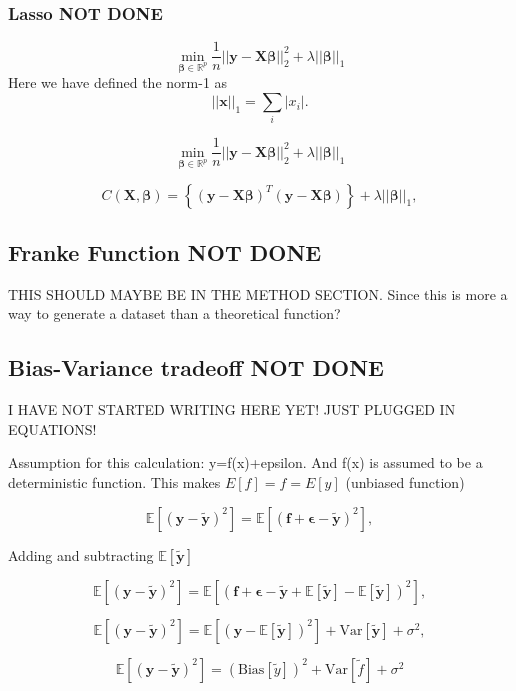 \subsubsection{Lasso NOT DONE}
$$
{\displaystyle \min_{\boldsymbol{\beta}\in
{\mathbb{R}}^{p}}}\frac{1}{n}\vert\vert \boldsymbol{y}-\boldsymbol{X}\boldsymbol{\beta}\vert\vert_2^2+\lambda\vert\vert \boldsymbol{\beta}\vert\vert_1
$$
Here we have defined the norm-1 as
$$
\vert\vert \boldsymbol{x}\vert\vert_1 = \sum_i \vert x_i\vert.
$$

$$
{\displaystyle \min_{\boldsymbol{\beta}\in
{\mathbb{R}}^{p}}}\frac{1}{n}\vert\vert \boldsymbol{y}-\boldsymbol{X}\boldsymbol{\beta}\vert\vert_2^2+\lambda\vert\vert \boldsymbol{\beta}\vert\vert_1
$$

$$
C(\boldsymbol{X},\boldsymbol{\beta})=\left\{(\boldsymbol{y}-\boldsymbol{X}\boldsymbol{\beta})^T(\boldsymbol{y}-\boldsymbol{X}\boldsymbol{\beta})\right\}+\lambda\vert\vert\boldsymbol{\beta}\vert\vert_1,
$$




\subsection{Franke Function NOT DONE}
THIS SHOULD MAYBE BE IN THE METHOD SECTION. Since this is more a way to generate a dataset than a theoretical function?


\subsection{Bias-Variance tradeoff NOT DONE}
I HAVE NOT STARTED WRITING HERE YET! JUST PLUGGED IN EQUATIONS!

Assumption for this calculation: y=f(x)+epsilon. And f(x) is assumed to be a deterministic function. This makes $E[f]=f=E[y]$ (unbiased function)

$$
\mathbb{E}\left[(\mathbf{y}-\mathbf{\tilde{y}})^2\right]=\mathbb{E}\left[(\mathbf{f}+\mathbf{\epsilon}-\mathbf{\tilde{y}})^2\right],
$$

Adding and subtracting $\mathbb{E}\left[\mathbf{\tilde{y}}\right]$

$$
\mathbb{E}\left[(\mathbf{y}-\mathbf{\tilde{y}})^2\right]=\mathbb{E}\left[(\mathbf{f}+\mathbf{\epsilon}-\mathbf{\tilde{y}}+\mathbb{E}\left[\mathbf{\tilde{y}}\right]-\mathbb{E}\left[\mathbf{\tilde{y}}\right])^2\right],
$$

$$
\mathbb{E}\left[(\mathbf{y}-\mathbf{\tilde{y}})^2\right]=\mathbb{E}\left[(\mathbf{y}-\mathbb{E}\left[\mathbf{\tilde{y}}\right])^2\right]+\mathrm{Var}\left[\mathbf{\tilde{y}}\right]+\sigma^2,
$$

$$
\mathbb{E}\left[(\mathbf{y}-\mathbf{\tilde{y}})^2\right]=\left(\mbox{Bias}\left[{\tilde y}\right] \right)^2 + \mbox{Var}\left[{\tilde f} \right] + \sigma^2
$$

